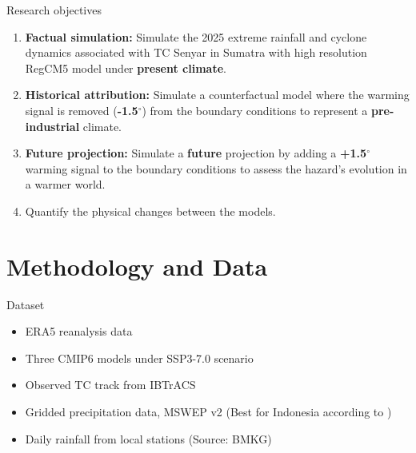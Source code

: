\documentclass[
11pt,notheorems,hyperref={pdfauthor=whatever}
]{beamer}
\begin{document}
\begin{frame}
    \begin{block}{Research objectives}
        \begin{enumerate}
            \item \textbf{Factual simulation:} Simulate the 2025 extreme rainfall and cyclone dynamics associated with TC Senyar in Sumatra with high resolution RegCM5 model under \textbf{present climate}.
            \item \textbf{Historical attribution:} Simulate a counterfactual model where the warming signal is removed (\textbf{-1.5$^\circ$}) from the boundary conditions to represent a \textbf{pre-industrial} climate.
            \item \textbf{Future projection:} Simulate a \textbf{future} projection by adding a \textbf{+1.5$^\circ$} warming signal to the boundary conditions to assess the hazard's evolution in a warmer world.
            \item Quantify the physical changes between the models.
        \end{enumerate}
    \end{block}
\end{frame}

\section{Methodology and Data}

\begin{frame}

    \begin{block}{Dataset}
        \begin{itemize}
            \item ERA5 reanalysis data
            \item Three CMIP6 models under SSP3-7.0 scenario
            \item Observed TC track from IBTrACS
            \item Gridded precipitation data, MSWEP v2 (Best for Indonesia according to \citet{wati2022statistics})
            \item Daily rainfall from local stations (Source: BMKG)
        \end{itemize}
    \end{block}
\end{frame}
\end{document}

